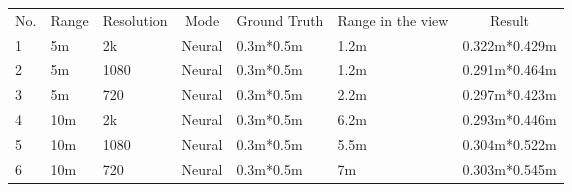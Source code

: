 \begin{table}[]
  \begin{tabular}{lllllll}
  \rowcolor[HTML]{4472C4} 
  No. & \multicolumn{1}{c}{\cellcolor[HTML]{4472C4}Range} & \multicolumn{1}{c}{\cellcolor[HTML]{4472C4}Resolution} & \multicolumn{1}{c}{\cellcolor[HTML]{4472C4}Mode} & \multicolumn{1}{c}{\cellcolor[HTML]{4472C4}Ground Truth} & \multicolumn{1}{c}{\cellcolor[HTML]{4472C4}Range in the view} & \multicolumn{1}{c}{\cellcolor[HTML]{4472C4}Result} \\
  1   & 5m                                                & 2k                                                     & Neural                                           & 0.3m*0.5m                                                & 1.2m                                                          & 0.322m*0.429m                                      \\
  2   & 5m                                                & 1080                                                   & Neural                                           & 0.3m*0.5m                                                & 1.2m                                                          & 0.291m*0.464m                                      \\
  3   & 5m                                                & 720                                                    & Neural                                           & 0.3m*0.5m                                                & 2.2m                                                          & 0.297m*0.423m                                      \\
  4   & 10m                                               & 2k                                                     & Neural                                           & 0.3m*0.5m                                                & 6.2m                                                          & 0.293m*0.446m                                      \\
  5   & 10m                                               & 1080                                                   & Neural                                           & 0.3m*0.5m                                                & 5.5m                                                          & 0.304m*0.522m                                      \\
  6   & 10m                                               & 720                                                    & Neural                                           & 0.3m*0.5m                                                & 7m                                                            & 0.303m*0.545m                                      \\

\end{tabular}
\end{table}
